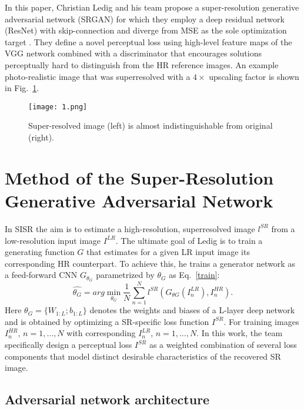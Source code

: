 \documentclass[10pt,twocolumn,letterpaper]{article}
\begin{document}
In this paper, Christian Ledig and his team propose a super-resolution generative adversarial network (SRGAN) for which they employ a deep residual network (ResNet) with skip-connection and diverge from MSE as the sole optimization target \cite{Ledig2017Photo}. They define a novel perceptual loss using high-level feature maps of the VGG network \cite{Johnson2016Perceptual} combined with a discriminator that encourages solutions perceptually hard to distinguish from the HR reference images. An example photo-realistic image that was superresolved with a $4\times$ upscaling factor is shown in Fig.~\ref{fig:1}.
\begin{figure}
	\begin{center}
		\texttt{[image: 1.png]}
	\end{center}
	\caption{Super-resolved image (left) is almost indistinguishable from original (right).}
	\label{fig:1}
\end{figure}

\section{Method of the Super-Resolution Generative Adversarial Network}

In SISR the aim is to estimate a high-resolution, superresolved image $l^{SR}$ from a low-resolution input image $I^{LR}$. The ultimate goal of Ledig is to train a generating function $G$ that estimates for a given LR input image its corresponding HR counterpart. To achieve this, he trains a generator network as a feed-forward CNN $G_{\theta_G}$ parametrized by $\theta_G$ as Eq.~\ref{train}:
\begin{equation}
\hat{\theta_G}=arg \min_{\theta_G} \frac{1}{N}\sum_{n=1}^{N}l^{SR}(G_{\theta G}(I_n^{LR}),I_n^{HR}).   \label{train}
\end{equation}
Here $\theta_G=\{W_{1:L};b_{1:L}\}$ denotes the weights and biases of a L-layer deep network and is obtained by optimizing a SR-specific loss function $I^{SR}$. For training images $I_n^{HR}$, $n = 1,\ldots,N$ with corresponding $I_n^{LR}$, $n = 1,\ldots,N$. In this work, the team specifically design a perceptual loss $I^{SR}$ as a weighted combination of several loss components that model distinct desirable characteristics of the recovered SR image.

\subsection{Adversarial network architecture}
\end{document}
